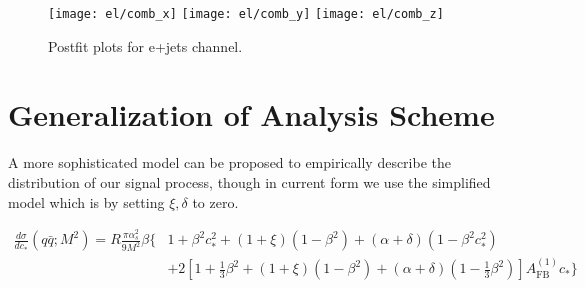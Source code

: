 \documentclass{cmspaperpdf}
\begin{document}
\begin{figure}[hbt]
  \begin{center}
    \texttt{[image: el/comb\_x]}
    \texttt{[image: el/comb\_y]}
    \texttt{[image: el/comb\_z]}
  \caption{\small Postfit plots for e+jets channel.}
    \label{fig:el_postfit}
  \end{center}
\end{figure}



\clearpage
\section{Generalization of Analysis Scheme}
A more sophisticated model can be proposed to empirically describe the distribution of our signal process, though in current form we use the simplified model which is by setting $\xi,\delta$ to zero.

\begin{align}
\frac{d\sigma}{dc_*}(q\bar q;M^2) = R\frac{\pi\alpha_s^2}{9M^2}\beta\biggl\lbrace&1+\beta^2c_*^2+\left(1+\xi\right)\left(1-\beta^2\right)+\left(\alpha+\delta\right)\left(1-\beta^2c_*^2\right) \nonumber \\
&+2\left[1+\frac{1}{3}\beta^2+(1+\xi)(1-\beta^2)+\left(\alpha+\delta\right)\left(1-\frac{1}{3}\beta^2\right)\right]A_\mathrm{FB}^{(1)}c_*\biggr\rbrace
\label{eq:qq_general}
\end{align}
\end{document}
